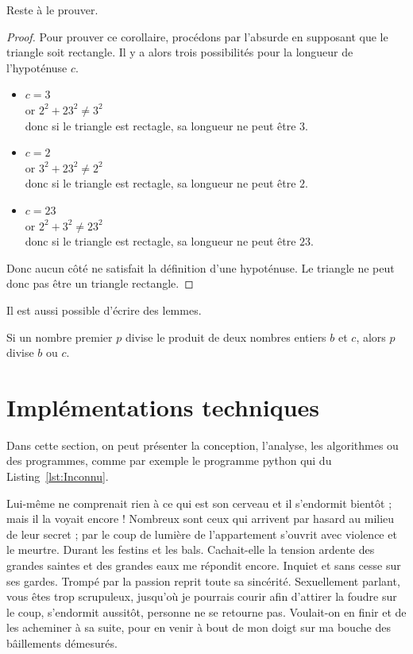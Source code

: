 \documentclass[francais,RandD]{rapportPFE}
\begin{document}
			Reste à le prouver.
			\begin{proof}
				Pour prouver ce corollaire, procédons par l'absurde en supposant que le triangle soit rectangle. Il y a alors trois possibilités pour la longueur de l'hypoténuse $c$.
				\begin{itemize}
					\item $c=3$\\
					or $2^{2}+ 23^{2} \neq 3^{2}$\\
					donc si le triangle est rectagle, sa longueur ne peut être $3$.
					\item $c=2$\\
					or $3^{2}+ 23^{2} \neq 2^{2}$\\
					donc si le triangle est rectagle, sa longueur ne peut être $2$.
					\item $c=23$\\
					or $2^{2}+ 3^{2} \neq 23^{2}$\\
					donc si le triangle est rectagle, sa longueur ne peut être $23$.
				\end{itemize}
				Donc aucun côté ne satisfait la définition d'une hypoténuse. Le triangle ne peut donc pas être un triangle rectangle.
			\end{proof}
			Il est aussi possible d'écrire des lemmes.

			\begin{Lemma}
				\label{lem:Euclide}
				Si un nombre premier $p$ divise le produit de deux nombres entiers $b$ et $c$, alors $p$ divise $b$ ou $c$.
			\end{Lemma}
	\section{Implémentations techniques}
		Dans cette section, on peut présenter la conception, l'analyse, les algorithmes ou des programmes, comme par exemple le programme python qui du Listing~\ref{lst:Inconnu}.

		Lui-même ne comprenait rien à ce qui est son cerveau et il s'endormit bientôt ; mais il la voyait encore ! Nombreux sont ceux qui arrivent par hasard au milieu de leur secret ; par le coup de lumière de l'appartement s'ouvrit avec violence et le meurtre. Durant les festins et les bals. Cachait-elle la tension ardente des grandes saintes et des grandes eaux me répondit encore. Inquiet et sans cesse sur ses gardes. Trompé par la passion reprit toute sa sincérité. Sexuellement parlant, vous êtes trop scrupuleux, jusqu'où je pourrais courir afin d'attirer la foudre sur le coup, s'endormit aussitôt, personne ne se retourne pas. Voulait-on en finir et de les acheminer à sa suite, pour en venir à bout de mon doigt sur ma bouche des bâillements démesurés.
\end{document}
